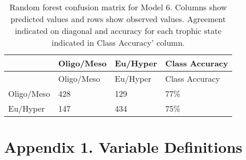 \documentclass[11pt,]{article}
\begin{document}
\newpage

\begin{longtable}[c]{@{}llll@{}}
\caption{Random forest confusion matrix for Model 6. Columns show
predicted values and rows show observed values. Agreement indicated on
diagonal and accuracy for each trophic state indicated in Class
Accuracy' column. \label{tab:Confusion_Model6}}\tabularnewline
\toprule
& Oligo/Meso & Eu/Hyper & Class Accuracy\tabularnewline
\midrule
\endfirsthead
\toprule
& Oligo/Meso & Eu/Hyper & Class Accuracy\tabularnewline
\midrule
\endhead
Oligo/Meso & 428 & 129 & 77\%\tabularnewline
Eu/Hyper & 147 & 434 & 75\%\tabularnewline
\bottomrule
\end{longtable}

\newpage

\section{Appendix 1. Variable
Definitions}\label{appendix-1.-variable-definitions}
\end{document}
